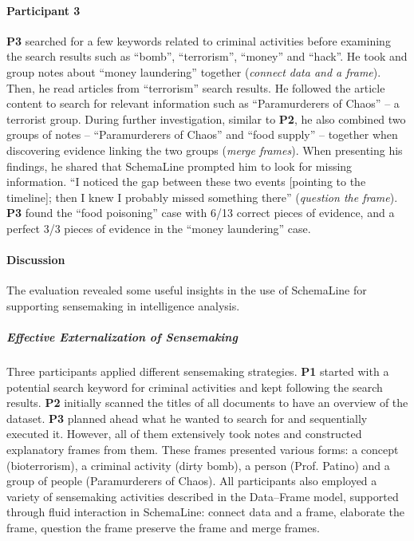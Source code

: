 \paragraph{Participant 3}
\textbf{P3} searched for a few keywords related to criminal activities before examining the search results such as ``bomb'', ``terrorism'', ``money'' and ``hack''. He took and group notes about ``money laundering'' together (\emph{connect data and a frame}). Then, he read articles from ``terrorism'' search results. He followed the article content to search for relevant information such as ``Paramurderers of Chaos'' -- a terrorist group. During further investigation, similar to \textbf{P2}, he also combined two groups of notes -- ``Paramurderers of Chaos'' and ``food supply'' -- together when discovering evidence linking the two groups (\emph{merge frames}). When presenting his findings, he shared that SchemaLine prompted him to look for missing information. ``I noticed the gap between these two events [pointing to the timeline]; then I knew I probably missed something there'' (\emph{question the frame}). \textbf{P3} found the ``food poisoning'' case with 6/13 correct pieces of evidence, and a perfect 3/3 pieces of evidence in the ``money laundering'' case.

\paragraph{Discussion}
The evaluation revealed some useful insights in the use of SchemaLine for supporting sensemaking in intelligence analysis.

\subparagraph{Effective Externalization of Sensemaking}
Three participants applied different sensemaking strategies. \textbf{P1} started with a potential search keyword for criminal activities and kept following the search results. \textbf{P2} initially scanned the titles of all documents to have an overview of the dataset. \textbf{P3} planned ahead what he wanted to search for and sequentially executed it. However, all of them extensively took notes and constructed explanatory frames from them. These frames presented various forms: a concept (bioterrorism), a criminal activity (dirty bomb), a person (Prof. Patino) and a group of people (Paramurderers of Chaos). All participants also employed a variety of sensemaking activities described in the Data--Frame model, supported through fluid interaction in SchemaLine: connect data and a frame, elaborate the frame, question the frame preserve the frame and merge frames.

